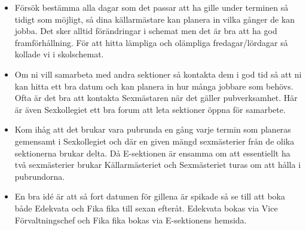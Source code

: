 \documentclass[10pt]{article}
\begin{document}
    \begin{itemize}
        \item Försök bestämma alla dagar som det passar att ha gille under terminen så tidigt som möjligt, så dina källarmästare kan planera in vilka gånger de kan jobba. Det sker alltid förändringar i schemat men det är bra att ha god framförhållning. För att hitta lämpliga och olämpliga fredagar/lördagar så kollade vi i skolschemat.
        \item Om ni vill samarbeta med andra sektioner så kontakta dem i god tid så att ni kan hitta ett bra datum och kan planera in hur många jobbare som behövs. Ofta är det bra att kontakta Sexmästaren när det gäller pubverksamhet. Här är även Sexkollegiet ett bra forum att leta sektioner öppna för samarbete.
        \item Kom ihåg att det brukar vara pubrunda en gång varje termin som planeras gemensamt i Sexkollegiet och där en given mängd sexmästerier från de olika sektionerna brukar delta. Då E-sektionen är ensamma om att essentiellt ha två sexmästerier brukar Källarmästeriet och Sexmästeriet turas om att hålla i pubrundorna.
        \item En bra idé är att så fort datumen för gillena är spikade så se till att boka både Edekvata och Fika fika till sexan efteråt. Edekvata bokas via Vice Förvaltningschef och Fika fika bokas via E-sektionens hemsida.

    \end{itemize}
\end{document}

